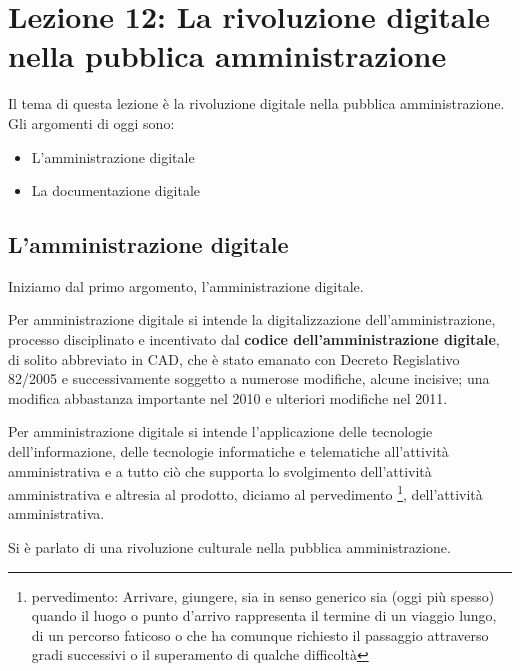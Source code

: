 \chapter{Lezione 12: La rivoluzione digitale nella pubblica amministrazione}

Il tema di questa lezione è la rivoluzione digitale nella pubblica amministrazione. 
Gli argomenti di oggi sono:
\begin{itemize}
    \item L'amministrazione digitale
    \item La documentazione digitale
\end{itemize}

\section{L'amministrazione digitale}
Iniziamo dal primo argomento, l'amministrazione digitale. \par
Per amministrazione digitale si intende la digitalizzazione dell'amministrazione, processo disciplinato e incentivato dal \textbf{codice dell'amministrazione digitale}, di solito abbreviato in CAD, che è stato emanato con Decreto Regislativo 82/2005 e successivamente soggetto a numerose modifiche, alcune incisive; una modifica abbastanza importante nel 2010 e ulteriori modifiche nel 2011.\par 
Per amministrazione digitale si intende l'applicazione delle tecnologie dell'informazione, delle tecnologie informatiche e telematiche all'attività amministrativa e a tutto ciò che supporta lo svolgimento dell'attività amministrativa e altresia al prodotto, diciamo al pervedimento \footnote{pervedimento: Arrivare, giungere, sia in senso generico sia (oggi più spesso) quando il luogo o punto d'arrivo rappresenta il termine di un viaggio lungo, di un percorso faticoso o che ha comunque richiesto il passaggio attraverso gradi successivi o il superamento di qualche difficoltà}, dell'attività amministrativa.\par
Si è parlato di una rivoluzione culturale nella pubblica amministrazione. \par



